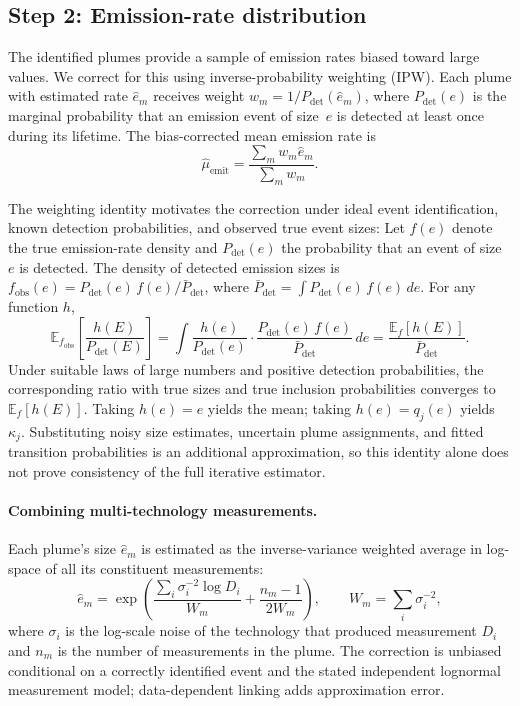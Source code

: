 \documentclass[11pt]{article}
\newcommand{\E}{\mathbb{E}}
\begin{document}
\subsection{Step 2: Emission-rate distribution}
\label{sec:event_ipw}

The identified plumes provide a sample of emission rates biased toward large values. We correct for this using inverse-probability weighting (IPW). Each plume with estimated rate $\hat{e}_m$ receives weight $w_m = 1/P_{\text{det}}(\hat{e}_m)$, where $P_{\text{det}}(e)$ is the marginal probability that an emission event of size~$e$ is detected at least once during its lifetime. The bias-corrected mean emission rate is
\begin{equation}
    \hat{\mu}_{\text{emit}} = \frac{\sum_m w_m \hat{e}_m}{\sum_m w_m}.
\end{equation}

The weighting identity motivates the correction under ideal event identification, known detection probabilities, and observed true event sizes:
Let $f(e)$ denote the true emission-rate density and $P_{\text{det}}(e)$ the probability that an event of size~$e$ is detected. The density of detected emission sizes is $f_{\text{obs}}(e) = P_{\text{det}}(e)\,f(e)/\bar{P}_{\text{det}}$, where $\bar{P}_{\text{det}} = \int P_{\text{det}}(e)\,f(e)\,de$. For any function $h$,
\begin{equation}
    \E_{f_{\text{obs}}}\!\left[\frac{h(E)}{P_{\text{det}}(E)}\right] = \int \frac{h(e)}{P_{\text{det}}(e)} \cdot \frac{P_{\text{det}}(e)\,f(e)}{\bar{P}_{\text{det}}} \, de = \frac{\E_f[h(E)]}{\bar{P}_{\text{det}}}.
\end{equation}
Under suitable laws of large numbers and positive detection probabilities, the corresponding ratio with true sizes and true inclusion probabilities converges to $\E_f[h(E)]$. Taking $h(e)=e$ yields the mean; taking $h(e)=q_j(e)$ yields $\kappa_j$. Substituting noisy size estimates, uncertain plume assignments, and fitted transition probabilities is an additional approximation, so this identity alone does not prove consistency of the full iterative estimator.

\paragraph{Combining multi-technology measurements.}
Each plume's size $\hat{e}_m$ is estimated as the inverse-variance weighted average in log-space of all its constituent measurements:
\begin{equation}
    \hat e_m=\exp\!\left(\frac{\sum_i\sigma_i^{-2}\log D_i}{W_m}+\frac{n_m-1}{2W_m}\right),\qquad W_m=\sum_i\sigma_i^{-2},
\end{equation}
where $\sigma_i$ is the log-scale noise of the technology that produced measurement $D_i$ and $n_m$ is the number of measurements in the plume. The correction is unbiased conditional on a correctly identified event and the stated independent lognormal measurement model; data-dependent linking adds approximation error.
\end{document}
